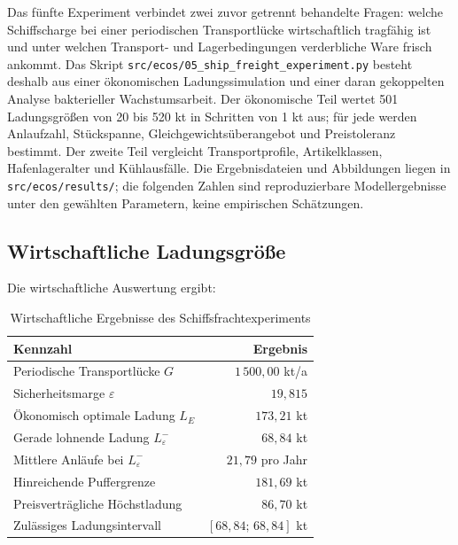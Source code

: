\documentclass[a4paper, 12pt, twoside, openright]{report}
\theoremstyle{definition}
\theoremstyle{definition}
\begin{document}
Das fünfte Experiment verbindet zwei zuvor getrennt behandelte Fragen: welche
Schiffscharge bei einer periodischen Transportlücke wirtschaftlich tragfähig ist
und unter welchen Transport- und Lagerbedingungen verderbliche Ware frisch
ankommt. Das Skript
\texttt{src/ecos/05\_ship\_freight\_experiment.py} besteht deshalb aus einer
ökonomischen Ladungssimulation und einer daran gekoppelten Analyse bakterieller
Wachstumsarbeit. Der ökonomische Teil wertet 501 Ladungsgrößen von 20 bis
520 kt in Schritten von 1 kt aus; für jede werden Anlaufzahl, Stückspanne,
Gleichgewichtsüberangebot und Preistoleranz bestimmt. Der zweite Teil vergleicht
Transportprofile, Artikelklassen, Hafenlageralter und Kühlausfälle. Die
Ergebnisdateien und Abbildungen liegen in
\texttt{src/ecos/results/}; die folgenden Zahlen sind reproduzierbare
Modellergebnisse unter den gewählten Parametern, keine empirischen Schätzungen.

\subsection{Wirtschaftliche Ladungsgröße}

Die wirtschaftliche Auswertung ergibt:

\begin{table}[htbp]
  \centering
  \caption{Wirtschaftliche Ergebnisse des Schiffsfrachtexperiments}
  \label{tab:experiment-schiffsfracht}
  \begin{tabular}{lr}
    \toprule
    Kennzahl & Ergebnis \\
    \midrule
    Periodische Transportlücke $G$ & $1\,500{,}00$ kt/a \\
    Sicherheitsmarge $\varepsilon$ & $19{,}815$ \\
    Ökonomisch optimale Ladung $L_E$ & $173{,}21$ kt \\
    Gerade lohnende Ladung $L^-_\varepsilon$ & $68{,}84$ kt \\
    Mittlere Anläufe bei $L^-_\varepsilon$ & $21{,}79$ pro Jahr \\
    Hinreichende Puffergrenze & $181{,}69$ kt \\
    Preisverträgliche Höchstladung & $86{,}70$ kt \\
    Zulässiges Ladungsintervall & $[68{,}84;\,68{,}84]$ kt \\
    \bottomrule
  \end{tabular}
\end{table}
\end{document}

